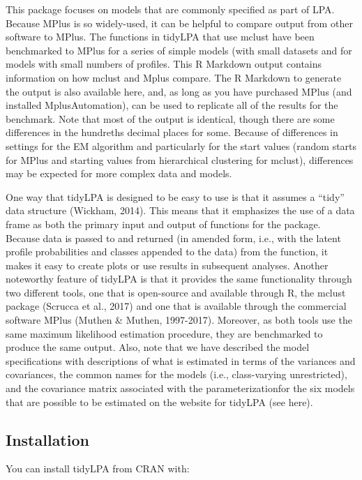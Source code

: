 \documentclass[
  english,
  man]{apa6}
\begin{document}
This package focuses on models that are commonly specified as part of LPA.
Because MPlus is so widely-used, it can be helpful to compare output from other
software to MPlus. The functions in tidyLPA that use mclust have been
benchmarked to MPlus for a series of simple models (with small datasets and for
models with small numbers of profiles. This R Markdown output contains
information on how mclust and Mplus compare. The R Markdown to generate the
output is also available here, and, as long as you have purchased MPlus (and
installed MplusAutomation), can be used to replicate all of the results for the
benchmark. Note that most of the output is identical, though there are some
differences in the hundreths decimal places for some. Because of differences in
settings for the EM algorithm and particularly for the start values (random
starts for MPlus and starting values from hierarchical clustering for mclust),
differences may be expected for more complex data and models.

One way that tidyLPA is designed to be easy to use is that it assumes a \enquote{tidy}
data structure (Wickham, 2014). This means that it emphasizes the use of a data
frame as both the primary input and output of functions for the package. Because
data is passed to and returned (in amended form, i.e., with the latent profile
probabilities and classes appended to the data) from the function, it makes it
easy to create plots or use results in subsequent analyses. Another noteworthy
feature of tidyLPA is that it provides the same functionality through two
different tools, one that is open-source and available through R, the mclust
package (Scrucca et al., 2017) and one that is available through the commercial
software MPlus (Muthen \& Muthen, 1997-2017). Moreover, as both tools use the
same maximum likelihood estimation procedure, they are benchmarked to produce
the same output. Also, note that we have described the model
specifications with descriptions of what is estimated in terms of the variances
and covariances, the common names for the models (i.e., class-varying
unrestricted), and the covariance matrix associated with the parameterizationfor
the six models that are possible to be estimated on the website for tidyLPA (see
here).

\hypertarget{installation}{%
\subsection{Installation}\label{installation}}

You can install tidyLPA from CRAN with:
\end{document}
